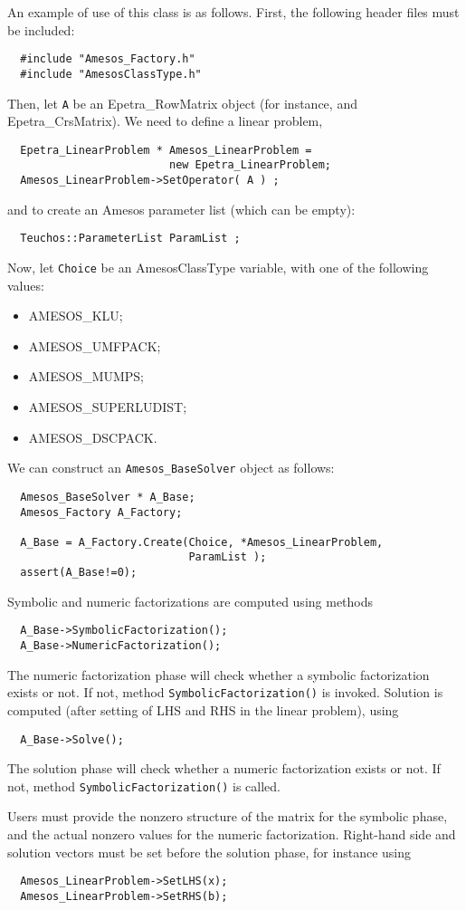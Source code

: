 An example of use of this class is as follows. First, the following
header files must be included:
\begin{verbatim}
  #include "Amesos_Factory.h" 
  #include "AmesosClassType.h"
\end{verbatim}
Then, let \verb!A! be an Epetra\_RowMatrix object (for instance, and
Epetra\_CrsMatrix). We need to define a linear problem,
\begin{verbatim}
  Epetra_LinearProblem * Amesos_LinearProblem = 
                         new Epetra_LinearProblem;
  Amesos_LinearProblem->SetOperator( A ) ; 
\end{verbatim}
and to create an Amesos parameter list (which can be empty):
\begin{verbatim}
  Teuchos::ParameterList ParamList ;
\end{verbatim}
Now, let \verb!Choice! be an AmesosClassType variable, with one of the
following values: 
\begin{itemize}
\item AMESOS\_KLU;
\item AMESOS\_UMFPACK;
\item AMESOS\_MUMPS;
\item AMESOS\_SUPERLUDIST;
\item AMESOS\_DSCPACK.
\end{itemize}
We can construct an \verb!Amesos_BaseSolver! object as follows:
\begin{verbatim}
  Amesos_BaseSolver * A_Base;
  Amesos_Factory A_Factory;

  A_Base = A_Factory.Create(Choice, *Amesos_LinearProblem, 
                            ParamList );
  assert(A_Base!=0);
\end{verbatim}
Symbolic and numeric factorizations are computed using methods
\begin{verbatim}
  A_Base->SymbolicFactorization();
  A_Base->NumericFactorization();
\end{verbatim}
The numeric factorization phase will check whether a symbolic
factorization exists or not. If not, method
\verb!SymbolicFactorization()! is invoked.  Solution is computed (after
setting of LHS and RHS in the linear problem), using
\begin{verbatim}
  A_Base->Solve();
\end{verbatim}
The solution phase will check whether a numeric factorization exists or
not. If not, method \verb!SymbolicFactorization()! is called.

Users must provide the nonzero structure of the matrix for the symbolic
phase, and the actual nonzero values for the numeric
factorization. Right-hand side and solution vectors must be set before
the solution phase, for instance using
\begin{verbatim}
  Amesos_LinearProblem->SetLHS(x);
  Amesos_LinearProblem->SetRHS(b);
\end{verbatim}

